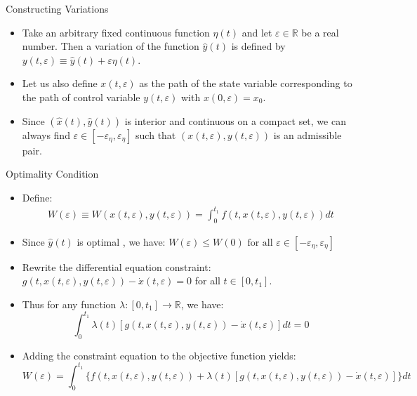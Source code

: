 \documentclass[9pt,aspectratio=169]{beamer}
\begin{document}
\begin{frame}{Constructing Variations}
    \begin{itemize}
        \item Take an arbitrary fixed continuous function $\eta(t)$ and let
        $\varepsilon \in \mathbb{R}$ be a real number. Then a variation of
        the function $\hat{y}(t)$ is defined by $y(t, \varepsilon) \equiv
        \hat{y}(t) + \varepsilon\eta(t)$.
        \item Let us also define $x(t, \varepsilon)$ as the path of the state
        variable corresponding to the path of control variable $y(t,
        \varepsilon)$ with $x(0, \varepsilon) = x_0$.
        \item Since $(\hat{x}(t), \hat{y}(t))$ is interior and continuous on
        a compact set, we can always find $\varepsilon \in
        [-\varepsilon_\eta, \varepsilon_\eta]$ such that $(x(t, \varepsilon),
        y(t, \varepsilon))$ is an admissible pair.
    \end{itemize}
\end{frame}

\begin{frame}{Optimality Condition}
    \begin{itemize}
        \item Define:
    \begin{align*}
        W(\varepsilon) \equiv W(x(t, \varepsilon), y(t, \varepsilon)) =
        \int_0^{t_1} f(t, x(t, \varepsilon), y(t, \varepsilon))dt 
    \end{align*}
    \item Since $\hat{y}(t)$ is optimal , we have:
    $W(\varepsilon) \leq W(0) \text{ for all } \varepsilon \in
    [-\varepsilon_\eta, \varepsilon_\eta]$
    \item Rewrite the differential equation constraint: $g(t, x(t,
    \varepsilon), y(t, \varepsilon)) - \dot{x}(t, \varepsilon) = 0$ for all
    $t \in [0, t_1]$.
    \item Thus for any function $\lambda : [0, t_1] \rightarrow \mathbb{R}$,
    we have:
    \begin{equation*}
        \int_0^{t_1} \lambda(t)[g(t, x(t, \varepsilon), y(t, \varepsilon)) -
        \dot{x}(t, \varepsilon)] dt = 0
    \end{equation*}
    \item Adding the constraint equation to the objective function yields:
    \begin{equation*}
        W(\varepsilon) = \int_0^{t_1} \{f(t, x(t, \varepsilon), y(t,
        \varepsilon)) + \lambda(t)[g(t, x(t, \varepsilon), y(t, \varepsilon))
        - \dot{x}(t, \varepsilon)]\}dt
    \end{equation*}
\end{itemize}

\end{frame}
\end{document}
